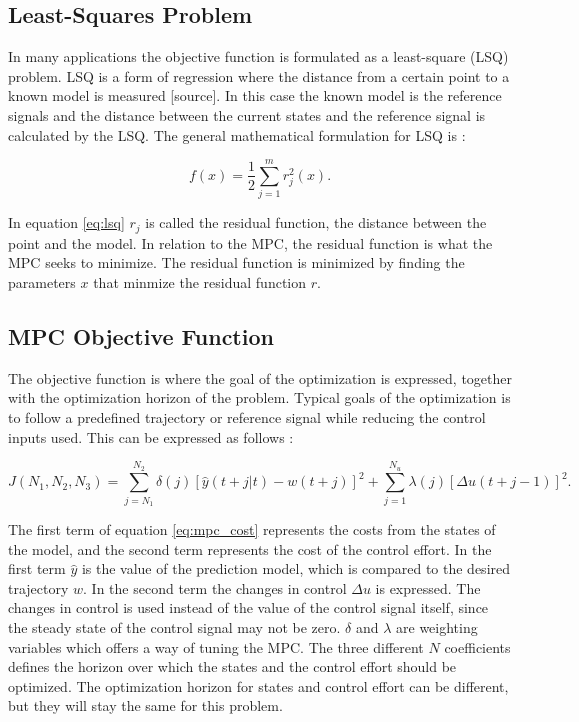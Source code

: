 \subsection{Least-Squares Problem}

In many applications the objective function is formulated as a least-square (LSQ) problem. LSQ is a form of regression where the distance from a certain point to a known model is measured [source]. In this case the known model is the reference signals and the distance between the current states and the reference signal is calculated by the LSQ. The general mathematical formulation for LSQ is \cite{nocedalOPTIMIZATION}:

\begin{equation}
	\label{eq:lsq}
	f(x) = \frac{1}{2} \sum_{j=1}^m r_j^2(x).
\end{equation}

In equation \ref{eq:lsq} $r_j$ is called the residual function, the distance between the point and the model. In relation to the MPC, the residual function is what the MPC seeks to minimize. The residual function is minimized by finding the parameters $x$ that minmize the residual function $r$.

\subsection{MPC Objective Function}

The objective function is where the goal of the optimization is expressed, together with the optimization horizon of the problem. Typical goals of the optimization is to follow a predefined trajectory or reference signal while reducing the control inputs used. This can be expressed as follows \cite{mpcCAMACHO}:

\begin{equation}
	\label{eq:mpc_cost}
	J(N_1, N_2, N_3) = \sum_{j=N_1}^{N_2} \delta(j)[\hat{y}(t+j|t)-w(t+j)]^2 + 
	\sum_{j=1}^{N_u}\lambda(j)[\Delta u(t+j-1)]^2.
\end{equation}

The first term of equation \ref{eq:mpc_cost} represents the costs from the states of the model, and the second term represents the cost of the control effort. In the first term $\hat{y}$ is the value of the prediction model, which is compared to the desired trajectory $w$. In the second term the changes in control $\Delta u$ is expressed. The changes in control is used instead of the value of the control signal itself, since the steady state of the control signal may not be zero. $\delta$ and $\lambda$ are weighting variables which offers a way of tuning the MPC. The three different $N$ coefficients defines the horizon over which the states and the control effort should be optimized. The optimization horizon for states and control effort can be different, but they will stay the same for this problem.


